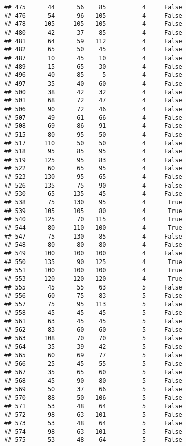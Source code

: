 \documentclass[
]{article}
\begin{document}
\begin{verbatim}
## 475      44      56    85          4     False
## 476      54      96   105          4     False
## 478     105     105   105          4     False
## 480      42      37    85          4     False
## 481      64      59   112          4     False
## 482      65      50    45          4     False
## 487      10      45    10          4     False
## 489      15      65    30          4     False
## 496      40      85     5          4     False
## 497      35      40    60          4     False
## 500      38      42    32          4     False
## 501      68      72    47          4     False
## 506      90      72    46          4     False
## 507      49      61    66          4     False
## 508      69      86    91          4     False
## 515      80      95    50          4     False
## 517     110      50    50          4     False
## 518      95      85    95          4     False
## 519     125      95    83          4     False
## 522      60      65    95          4     False
## 523     130      95    65          4     False
## 526     135      75    90          4     False
## 530      65     135    45          4     False
## 538      75     130    95          4      True
## 539     105     105    80          4      True
## 540     125      70   115          4      True
## 544      80     110   100          4      True
## 547      75     130    85          4     False
## 548      80      80    80          4     False
## 549     100     100   100          4     False
## 550     135      90   125          4      True
## 551     100     100   100          4      True
## 553     120     120   120          4      True
## 555      45      55    63          5     False
## 556      60      75    83          5     False
## 557      75      95   113          5     False
## 558      45      45    45          5     False
## 561      63      45    45          5     False
## 562      83      60    60          5     False
## 563     108      70    70          5     False
## 564      35      39    42          5     False
## 565      60      69    77          5     False
## 566      25      45    55          5     False
## 567      35      65    60          5     False
## 568      45      90    80          5     False
## 569      50      37    66          5     False
## 570      88      50   106          5     False
## 571      53      48    64          5     False
## 572      98      63   101          5     False
## 573      53      48    64          5     False
## 574      98      63   101          5     False
## 575      53      48    64          5     False

\end{verbatim}
\end{document}
